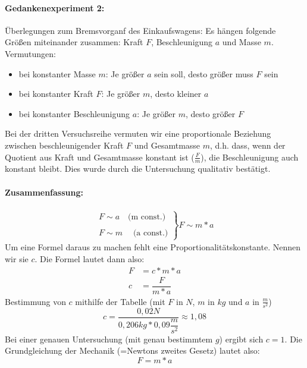 	\paragraph{Gedankenexperiment 2:}
	Überlegungen zum Bremsvorganf des Einkaufswagens: Es hängen folgende Größen miteinander zusammen: Kraft $ F $, Beschleunigung $ a $ und Masse $ m $.\\
	Vermutungen:
	\begin{itemize}
		\item bei konstanter Masse $ m $: Je größer $ a $ sein soll, desto größer muss $ F $ sein
		\item bei konstanter Kraft $ F $: Je größer $ m $, desto kleiner $ a $
		\item bei konstanter Beschleunigung $ a $: Je größer $ m $, desto größer $ F $
	\end{itemize}
	Bei der dritten Versuchsreihe vermuten wir eine proportionale Beziehung zwischen beschleunigender Kraft $ F $ und Gesamtmasse $ m $, d.h. dass, wenn der Quotient aus Kraft und Gesamtmasse konstant ist ($ \frac{F}{m} $), die Beschleunigung auch konstant bleibt. Dies wurde durch die Untersuchung qualitativ bestätigt.
	\paragraph{Zusammenfassung:}
	\begin{align}
		\left.
		\begin{array}{c}
		F \sim a \quad\text{(m const.)}\\
		\\
		F \sim m \; \quad\text{(a const.)}
		\end{array}
		\right\}
		F \sim m*a
	\end{align}
	Um eine Formel daraus zu machen fehlt eine Proportionalitätskonstante. Nennen wir sie $c$. Die Formel lautet dann also:
	\begin{align}
		F &= c*m*a\\
		c &= \dfrac{F}{m*a}
	\end{align}
	Bestimmung von $ c $ mithilfe der Tabelle (mit $ F $ in $ N $, $ m $ in $ kg $ und $ a $ in $ \frac{m}{s^2} $)
	\begin{equation}
		c = \dfrac{0,02N}{0,206kg*0,09\dfrac{m}{s^2}} \approx 1,08
	\end{equation}
	Bei einer genauen Untersuchung (mit genau bestimmtem $ g $) ergibt sich $ c=1 $. Die Grundgleichung der Mechanik (=Newtons zweites Gesetz) lautet also:
	\begin{equation}
		F = m*a
	\end{equation}
	
